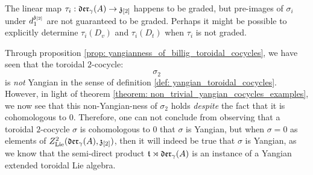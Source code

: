         \begin{remark}
            The linear map $\tau_i: \mathfrak{der}_{\gamma}(A) \to \mathfrak{z}_{[2]}$ happens to be graded, but pre-images of $\sigma_i$ under $d_1^{\mathfrak{z}_{[2]}}$ are not guaranteed to be graded. Perhaps it might be possible to explicitly determine $\tau_i(D_v)$ and $\tau_i(D_t)$ when $\tau_i$ is not graded.
        \end{remark}
        \begin{remark}
            Through proposition \ref{prop: yangianness_of_billig_toroidal_cocycles}, we have seen that the toroidal $2$-cocycle:
                $$\sigma_2$$
            is \textit{not} Yangian in the sense of definition \ref{def: yangian_toroidal_cocycles}. However, in light of theorem \ref{theorem: non_trivial_yangian_cocycles_examples}, we now see that this non-Yangian-ness of $\sigma_2$ holds \textit{despite} the fact that it is cohomologous to $0$. Therefore, one can not conclude from observing that a toroidal $2$-cocycle $\sigma$ is cohomologous to $0$ that $\sigma$ is Yangian, but when $\sigma = 0$ as elements of $Z^2_{\mathrm{Lie}}(\mathfrak{der}_{\gamma}(A), \mathfrak{z}_{[2]})$, then it will indeed be true that $\sigma$ is Yangian, as we know that the semi-direct product $\mathfrak{t} \rtimes \mathfrak{der}_{\gamma}(A)$ is an instance of a Yangian extended toroidal Lie algebra.
        \end{remark}